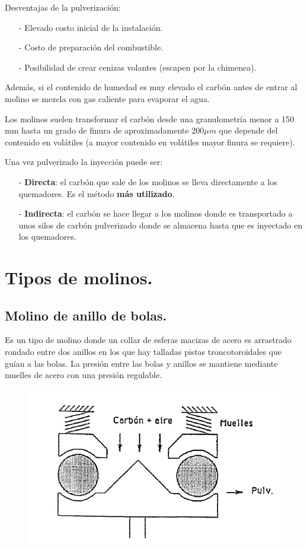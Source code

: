 Desventajas de la pulverización:
\begin{itemize}
	\item [-] Elevado costo inicial de la instalación.
	\item [-] Costo de preparación del combustible.
	\item [-] Posibilidad de crear cenizas volantes (escapen por la chimenea).
\end{itemize}




Además, si el contenido de humedad es muy elevado el carbón antes de entrar al molino se mezcla con gas caliente para evaporar el agua.



Los molinos suelen transformar el carbón desde una granulometría menor a 150 mm hasta un grado de finura de aproximadamente 200$\mu m$ que depende del contenido en volátiles (a mayor contenido en volátiles mayor finura se requiere).



Una vez pulverizado la inyección puede ser:
\begin{itemize}
	\item [-] \textbf{Directa}: el carbón que sale de los molinos se lleva directamente a los quemadores. Es el método \textbf{más utilizado}.
	\item [-] \textbf{Indirecta}: el carbón se hace llegar a los molinos donde es transportado a unos silos de carbón pulverizado donde se almacena hasta que es inyectado en los quemadores.
\end{itemize}
\section{Tipos de molinos.}

\subsection{Molino de anillo de bolas.}
Es un tipo de molino donde un collar de esferas macizas de acero es arrastrado rondado entre dos anillos en los que hay talladas pistas troncotoroidales que guían a las bolas. La presión entre las bolas y anillos se mantiene mediante muelles de acero con una presión regulable.
\begin{figure}[H]
	\centering
	\includegraphics[width=0.4\linewidth]{res/tema10/molinoBolas}
	\label{fig:molinobolas}
\end{figure}

